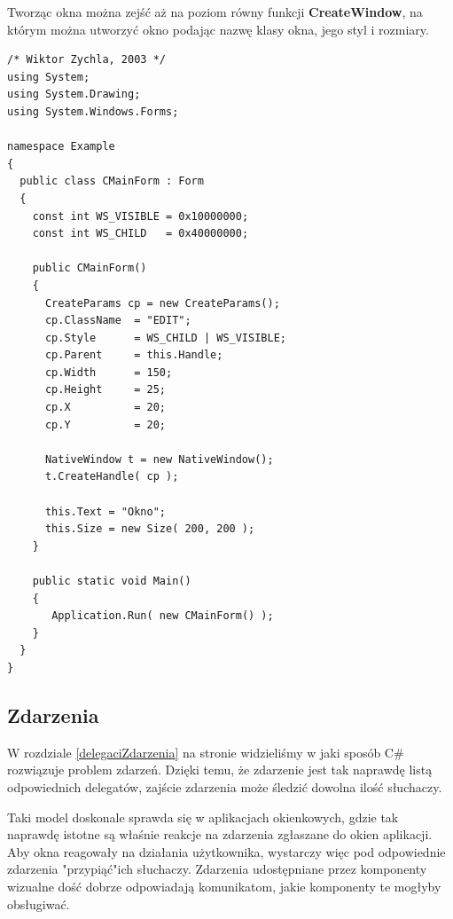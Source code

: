 Tworząc okna można zejść aż na poziom równy funkcji {\bf CreateWindow}, na którym można utworzyć
okno podając nazwę klasy okna, jego styl i rozmiary.

\begin{scriptsize}
\begin{verbatim}
/* Wiktor Zychla, 2003 */
using System;
using System.Drawing;
using System.Windows.Forms;

namespace Example
{
  public class CMainForm : Form
  {   
    const int WS_VISIBLE = 0x10000000;
    const int WS_CHILD   = 0x40000000;

    public CMainForm()
    {
      CreateParams cp = new CreateParams();
      cp.ClassName  = "EDIT";      
      cp.Style      = WS_CHILD | WS_VISIBLE;
      cp.Parent     = this.Handle;
      cp.Width      = 150;
      cp.Height     = 25;
      cp.X          = 20;
      cp.Y          = 20; 

      NativeWindow t = new NativeWindow();
      t.CreateHandle( cp );

      this.Text = "Okno"; 
      this.Size = new Size( 200, 200 );      
    }

    public static void Main()
    {
       Application.Run( new CMainForm() );
    }
  }
}
\end{verbatim}
\end{scriptsize}

\subsection{Zdarzenia}

W rozdziale \ref{delegaciZdarzenia} na stronie \pageref{delegaciZdarzenia} widzieliśmy w jaki sposób
C\# rozwiązuje problem zdarzeń. Dzięki temu, że zdarzenie jest tak naprawdę listą odpowiednich delegatów,
zajście zdarzenia może śledzić dowolna ilość słuchaczy.

Taki model doskonale sprawda się w aplikacjach okienkowych, gdzie tak naprawdę istotne są
właśnie reakcje na zdarzenia zgłaszane do okien aplikacji. Aby okna reagowały na działania użytkownika, wystarczy 
więc pod odpowiednie zdarzenia "przypiąć"ich słuchaczy. Zdarzenia udostępniane przez komponenty wizualne
dość dobrze odpowiadają komunikatom, jakie komponenty te mogłyby obsługiwać. 

